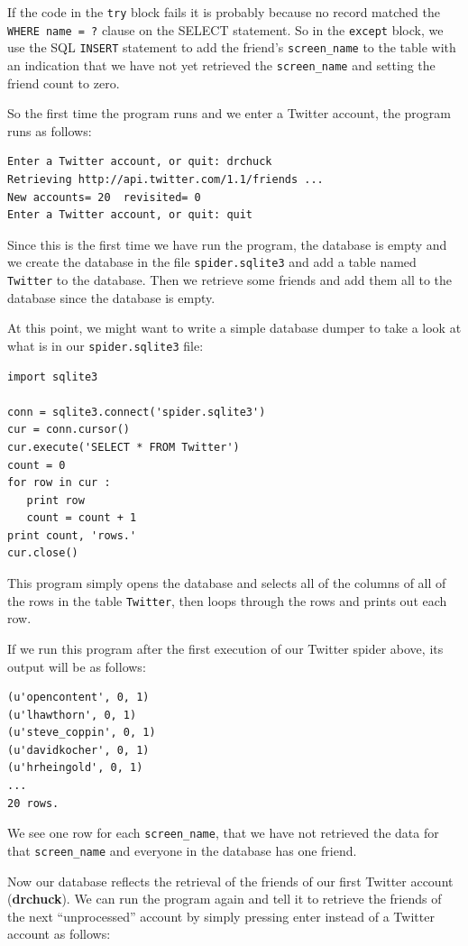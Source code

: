 If the code in the {\tt try} block fails it is probably because no record
matched the {\tt WHERE name = ?} clause on the SELECT statement.  So in the
{\tt except} block, we use the SQL {\tt INSERT} statement to add the friend's
\verb"screen_name" to the table with an indication that we have not yet 
retrieved the \verb"screen_name" and setting the friend count to zero.

So the first time the program runs and we enter a Twitter account, the program
runs as follows:

\beforeverb
\begin{verbatim}
Enter a Twitter account, or quit: drchuck
Retrieving http://api.twitter.com/1.1/friends ...
New accounts= 20  revisited= 0
Enter a Twitter account, or quit: quit
\end{verbatim}
\afterverb
%
Since this is the first time we have run the program, the database
is empty and we create the database in the file {\tt spider.sqlite3} and
add a table named {\tt Twitter} to the database.  Then we retrieve
some friends and add them all to the database since the database is
empty.

At this point, we might want to write a simple database dumper
to take a look at what is in our {\tt spider.sqlite3} file:

\beforeverb
\begin{verbatim}
import sqlite3

conn = sqlite3.connect('spider.sqlite3')
cur = conn.cursor()
cur.execute('SELECT * FROM Twitter')
count = 0
for row in cur :
   print row
   count = count + 1
print count, 'rows.'
cur.close()
\end{verbatim}
\afterverb
%
This program simply opens the database and selects all of the 
columns of all of the rows in the table {\tt Twitter}, then 
loops through the rows and prints out each row.

If we run this program after the first execution of our Twitter
spider above, its output will be as follows:

\beforeverb
\begin{verbatim}
(u'opencontent', 0, 1)
(u'lhawthorn', 0, 1)
(u'steve_coppin', 0, 1)
(u'davidkocher', 0, 1)
(u'hrheingold', 0, 1)
...
20 rows.
\end{verbatim}
\afterverb
%
We see one row for each \verb"screen_name", that we 
have not retrieved the data for that \verb"screen_name" and 
everyone in the database has one friend.

Now our database reflects the retrieval of the friends of 
our first Twitter account ({\bf drchuck}).  We can run the program
again and tell it to retrieve the friends of the next 
``unprocessed'' account by simply pressing enter instead of
a Twitter account as follows:

